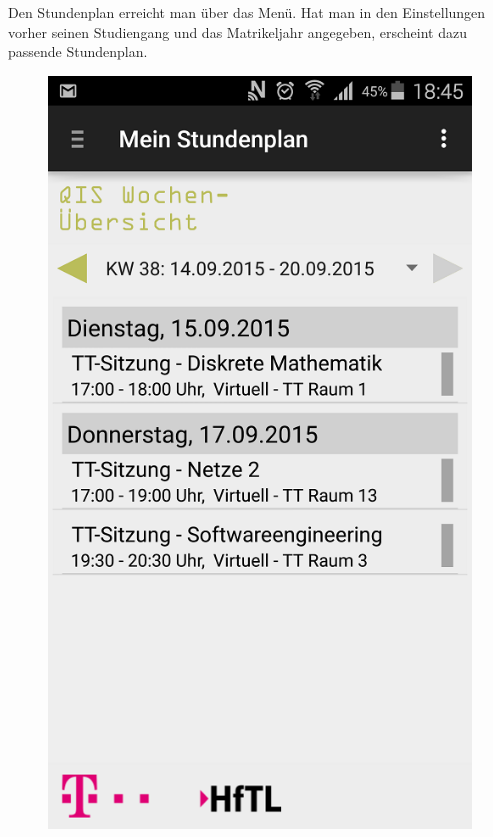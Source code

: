 Den Stundenplan erreicht man über das Menü. Hat man in den Einstellungen vorher seinen Studiengang und das Matrikeljahr angegeben, erscheint dazu passende Stundenplan.

\begin{figure}[h]
	\centering
	\includegraphics[scale=0.6]{03_Bedienungsanleitung/img/stundenplan.png}
	\label{img:grafik-dummy}
\end{figure}

